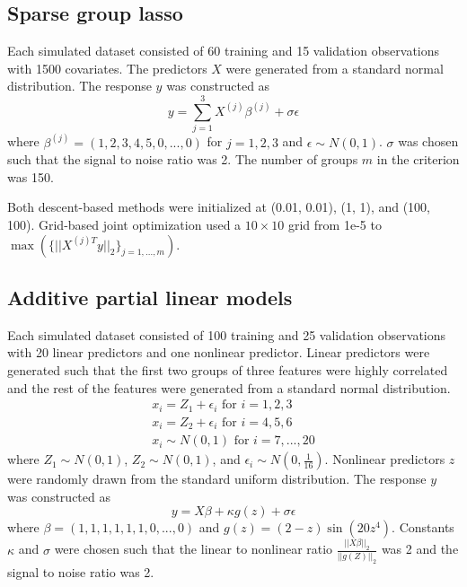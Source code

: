 \documentclass[10pt,letterpaper]{article}
\begin{document}
\subsection{Sparse group lasso}

Each simulated dataset consisted of 60 training and 15 validation observations with 1500 covariates. The predictors $X$ were generated from a standard normal distribution. The response $y$ was constructed as
\begin{equation}
y = \sum\limits_{j=1}^3 X^{(j)} \beta^{(j)} + \sigma \epsilon
\end{equation}
where $\beta^{(j)} = (1, 2, 3, 4, 5, 0, ..., 0)$ for $j = 1, 2, 3$ and $\epsilon \sim N(0, 1)$. $\sigma$ was chosen such that the signal to noise ratio was 2. The number of groups $m$ in the criterion was 150.

Both descent-based methods were initialized at (0.01, 0.01), (1, 1), and (100, 100). Grid-based joint optimization used a $10 \times 10$ grid from 1e-5 to $\max(\{||X^{(j)T}y ||_2\}_{j=1,..., m})$.

\subsection{Additive partial linear models}

Each simulated dataset consisted of 100 training and 25 validation observations with 20 linear predictors and one nonlinear predictor. Linear predictors were generated such that the first two groups of three features were highly correlated and the rest of the features were generated from a standard normal distribution.
\begin{equation}
\begin{array}{c}
x_i = Z_1 + \epsilon_i \text{ for } i=1, 2, 3 \\
x_i = Z_2 + \epsilon_i \text{ for } i= 4, 5, 6 \\
x_i \sim N(0,1) \text{ for } i = 7, ..., 20
\end{array}
\end{equation}
where $Z_1 \sim N(0,1)$, $Z_2 \sim N(0,1)$, and $\epsilon_i \sim N(0, \frac{1}{16})$. Nonlinear predictors $z$ were randomly drawn from the standard uniform distribution. The response $y$ was constructed as
\begin{equation}
y = X\beta + \kappa g(z) + \sigma \epsilon
\end{equation}
where $\beta = (1, 1, 1, 1, 1, 1, 0, ..., 0)$ and $g(z) =(2-z)\sin(20z^4)$. Constants $\kappa$ and $\sigma$ were chosen such that the linear to nonlinear ratio $\frac{||X\beta||_2}{||g(Z)||_2}$ was 2 and the signal to noise ratio was 2. 
\end{document}

